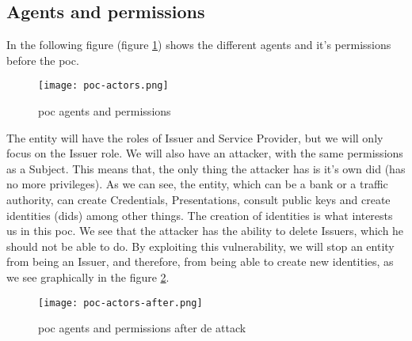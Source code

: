 \subsection{Agents and permissions}
In the following figure (figure \ref{fig:poc-actors}) shows the different agents and it's permissions before the \acrshort{poc}.\\
\begin{figure}[h]
    \centering
    \texttt{[image: poc-actors.png]}
    \caption{\acrshort{poc} agents and permissions}
    \label{fig:poc-actors}
\end{figure}

The entity will have the roles of Issuer and Service Provider, but we will only focus on the Issuer role. We will also have an attacker, with the same permissions as a Subject. This means that, the only thing the attacker has is it's own \acrshort{did} (has no more privileges). As we can see, the entity, which can be a bank or a traffic authority, can create Credentials, Presentations, consult public keys and create identities (\acrshort{did}s) among other things. The creation of identities is what interests us in this \acrshort{poc}. We see that the attacker has the ability to delete Issuers, which he should not be able to do. By exploiting this vulnerability, we will stop an entity from being an Issuer, and therefore, from being able to create new identities, as we see graphically in the figure \ref{fig:poc-actors-after}.

\begin{figure}[h]
    \centering
    \texttt{[image: poc-actors-after.png]}
    \caption{\acrshort{poc} agents and permissions after de attack}
    \label{fig:poc-actors-after}
\end{figure}
